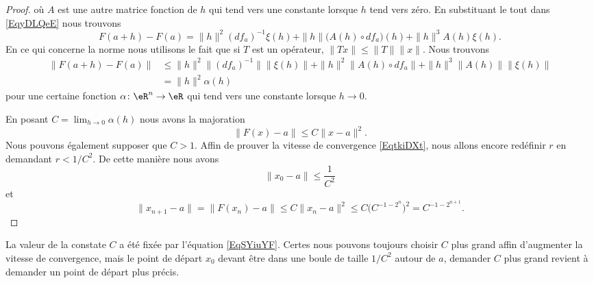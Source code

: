 \begin{proof}
        où \( A\) est une autre matrice fonction de \(h\) qui tend vers une constante lorsque \( h\) tend vers zéro. En substituant le tout dans \eqref{EqyDLQeE} nous trouvons
        \begin{equation}
            F(a+h)-F(a)=\| h \|^2(df_a)^{-1}\xi(h)+\| h \|\big( A(h)\circ df_a \big)(h)+\| h \|^3A(h)\xi(h).
        \end{equation}
        En ce qui concerne la norme nous utilisons le fait que si \( T\) est un opérateur, \( \| Tx \|\leq \| T \|\| x \|\). Nous trouvons
        \begin{subequations}
            \begin{align}
                \| F(a+h)-F(a) \|&\leq \| h \|^2\| (df_a)^{-1} \|\| \xi(h) \|+\| h \|^2\| A(h)\circ df_a \|+\| h \|^3\| A(h) \|\| \xi(h) \|\\
                &=\| h \|^2\alpha(h)
            \end{align}
        \end{subequations}
    pour une certaine fonction \( \alpha\colon \eR^n\to \eR\) qui tend vers une constante lorsque \( h\to 0\). 

    En posant \( C=\lim_{h\to 0}\alpha(h) \) nous avons la majoration
    \begin{equation}        \label{EqSYiuYF}
        \| F(x)-a \|\leq C\| x-a \|^2.
    \end{equation}
    Nous pouvons également supposer que \( C>1\). Affin de prouver la vitesse de convergence \eqref{EqtkiDXt}, nous allons encore redéfinir \( r\) en demandant \( r<1/C^2\). De cette manière nous avons
    \begin{equation}
        \| x_0-a \|\leq \frac{1}{ C^2 }
    \end{equation}
    et
    \begin{equation}
        \| x_{n+1}-a \|=\| F(x_n)-a \|\leq C\| x_n-a \|^2\leq C\big( C^{-1-2^n} \big)^2=C^{-1-2^{n+1}}.
    \end{equation}

\end{proof}

\begin{remark}
    La valeur de la constate \( C\) a été fixée par l'équation \eqref{EqSYiuYF}. Certes nous pouvons toujours choisir \( C\) plus grand affin d'augmenter la vitesse de convergence, mais le point de départ \( x_0\) devant être dans une boule de taille \( 1/C^2\) autour de \( a\), demander \( C \) plus grand revient à demander un point de départ plus précis.
\end{remark}

